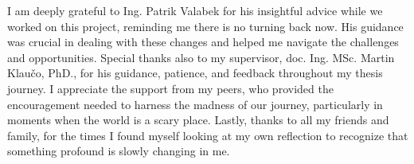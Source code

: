 I am deeply grateful to Ing. Patrik Valabek for his insightful advice while we worked on this project, reminding me there is no turning back now. His guidance was crucial in dealing with these changes and helped me navigate the challenges and opportunities.
Special thanks also to my supervisor, doc. Ing. MSc. Martin Klaučo, PhD., for his guidance, patience, and feedback throughout my thesis journey. 
I appreciate the support from my peers, who provided the encouragement needed to harness the madness of our journey, particularly in moments when the world is a scary place.
Lastly, thanks to all my friends and family, for the times I found myself looking at my own reflection to recognize that something profound is slowly changing in me.